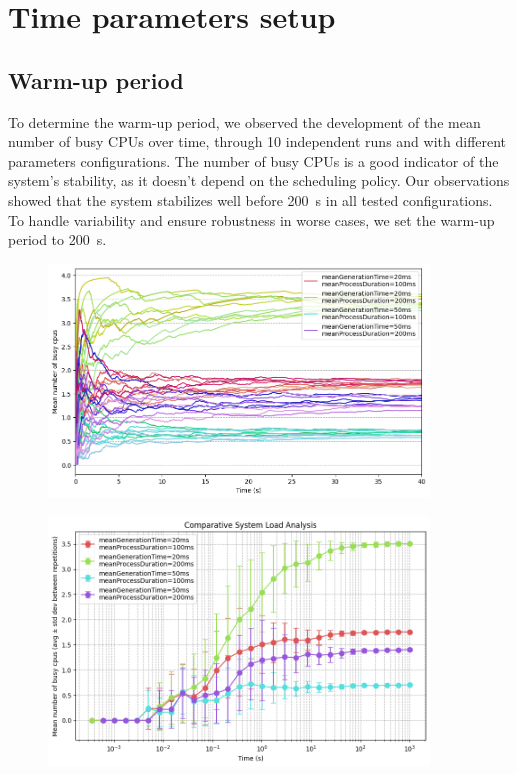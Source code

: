 \section{Time parameters setup}

\subsection{Warm-up period}

To determine the warm-up period, we observed the development of the mean number of busy CPUs over time, through 10 independent runs and with different parameters configurations. The number of busy CPUs is a good indicator of the system's stability, as it doesn't depend on the scheduling policy.
Our observations showed that the system stabilizes well before \SI{200}{\second} in all tested configurations. To handle variability and ensure robustness in worse cases, we set the warm-up period to \SI{200}{\second}.

\begin{figure}[H]
    \captionsetup{type=figure}
    \centering
    \includegraphics[width=0.9\textwidth]{./images/04/lineWarmup.png}
    \label{fig:lineWarmup}
\end{figure}

\begin{figure}[H]
    \captionsetup{type=figure}
    \centering
    \includegraphics[width=0.9\textwidth]{./images/04/errorWarmup.png}
    \label{fig:errorWarmup}
\end{figure}



